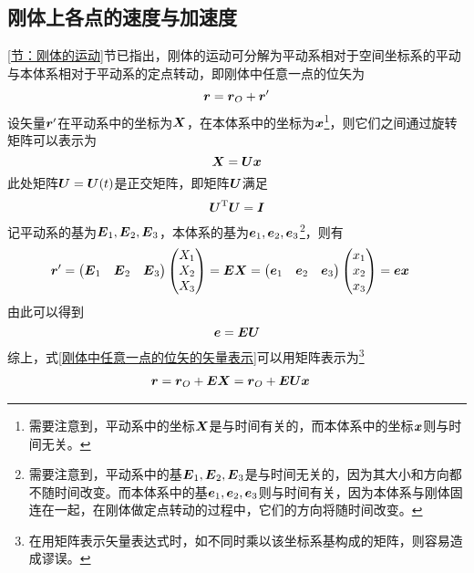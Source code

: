 \subsection{刚体上各点的速度与加速度}
\label{节：刚体上各点的速度与加速度}
\label{节：刚体运动的矢量-矩阵描述}

\ref{节：刚体的运动}节已指出，刚体的运动可分解为平动系相对于空间坐标系的平动与本体系相对于平动系的定点转动，即刚体中任意一点的位矢为
\begin{equation}
	\boldsymbol{r} = \boldsymbol{r}_O + \boldsymbol{r}'
	\label{刚体中任意一点的位矢的矢量表示}
\end{equation}
设矢量$\boldsymbol{r}'$在平动系中的坐标为$\boldsymbol{X}$，在本体系中的坐标为$\boldsymbol{x}$\footnote{需要注意到，平动系中的坐标$\boldsymbol{X}$是与时间有关的，而本体系中的坐标$\boldsymbol{x}$则与时间无关。}，则它们之间通过旋转矩阵可以表示为
\begin{equation*}
	\boldsymbol{X} = \boldsymbol{U} \boldsymbol{x}
\end{equation*}
此处矩阵$\boldsymbol{U} = \boldsymbol{U}(t)$是正交矩阵，即矩阵$\boldsymbol{U}$满足
\begin{equation}
	\boldsymbol{U}^{\mathrm{T}} \boldsymbol{U} = \boldsymbol{I}
	\label{正交矩阵的条件}
\end{equation}
记平动系的基为$\boldsymbol{E}_1,\boldsymbol{E}_2,\boldsymbol{E}_3$，本体系的基为$\boldsymbol{e}_1,\boldsymbol{e}_2,\boldsymbol{e}_3$\footnote{需要注意到，平动系中的基$\boldsymbol{E}_1,\boldsymbol{E}_2,\boldsymbol{E}_3$是与时间无关的，因为其大小和方向都不随时间改变。而本体系中的基$\boldsymbol{e}_1,\boldsymbol{e}_2,\boldsymbol{e}_3$则与时间有关，因为本体系与刚体固连在一起，在刚体做定点转动的过程中，它们的方向将随时间改变。}，则有
\begin{align*}
	\boldsymbol{r}' & = \begin{pmatrix} \boldsymbol{E}_1 & \boldsymbol{E}_2 & \boldsymbol{E}_3 \end{pmatrix} \begin{pmatrix} X_1 \\ X_2 \\ X_3 \end{pmatrix} = \boldsymbol{E} \boldsymbol{X} = \begin{pmatrix} \boldsymbol{e}_1 & \boldsymbol{e}_2 & \boldsymbol{e}_3 \end{pmatrix} \begin{pmatrix} x_1 \\ x_2 \\ x_3 \end{pmatrix} = \boldsymbol{e} \boldsymbol{x}
\end{align*}
由此可以得到
\begin{equation}
	\boldsymbol{e} = \boldsymbol{E} \boldsymbol{U}
	\label{chapter6:刚体上各点的速度与加速度1}
\end{equation}
综上，式\eqref{刚体中任意一点的位矢的矢量表示}可以用矩阵表示为\footnote{在用矩阵表示矢量表达式时，如不同时乘以该坐标系基构成的矩阵，则容易造成谬误。}
\begin{align}
	\boldsymbol{r} & = \boldsymbol{r}_O + \boldsymbol{E} \boldsymbol{X} = \boldsymbol{r}_O + \boldsymbol{E} \boldsymbol{U} \boldsymbol{x}
	\label{刚体中任意一点的位矢}
\end{align}

